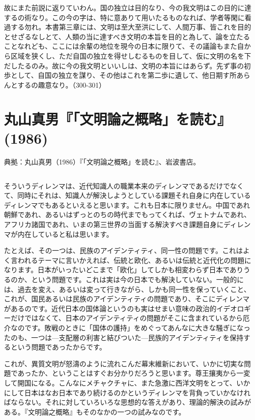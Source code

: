 故にまた前説に返りていわん。国の独立は目的なり、今の我文明はこの目的に達するの術なり。この今の字は、特に意ありて用いたるものなれば、学者等閑に看過する勿れ。本書第三章には、文明は至大至洪にして、人間万事、皆これを目的とせざるなしとて、人類の当に達すべき文明の本旨を目的と為して、論を立たることなれども、ここには余輩の地位を現今の日本に限りて、その議論もまた自から区域を狭くし、ただ自国の独立を得せしむるものを目して、仮に文明の名を下だしたるのみ。故に今の我文明といいしは、文明の本旨にはあらず。先ず事の初歩として、自国の独立を謀り、その他はこれを第二歩に遺して、他日期す所あらんとするの趣意なり。（300-301）




\section{丸山真男『「文明論之概略」を読む』 (1986)}



典拠：丸山真男（1986）『「文明論之概略」を読む』、岩波書店。

\subsection{}




そういうディレンマは、近代知識人の職業本来のディレンマであるだけでなくて、同時にそれは、知識人が解決しようとしている課題それ自身に内在しているディレンマでもあるといえると思います。これも日本に限りません。中国であれ朝鮮であれ、あるいはずっとのちの時代までもってくれば、ヴェトナムであれ、アフリカ諸国であれ、いまの第三世界の当面する解決すべき課題自身にディレンマが内在していると私は思います。

たとえば、その一つは、民族のアイデンティティ、同一性の問題です。これはよく言われるテーマに言いかえれば、伝統と欧化、あるいは伝統と近代化の問題になります。日本がいったいどこまで「欧化」してしかも相変わらず日本でありうるのか、という問題です。これは実は今の日本でも解決していない。一般的には、過去を変え、あるいは変って行きながら、しかも同一性を保っていくこと、これが、国民あるいは民族のアイデンティティの問題であり、そこにディレンマがあるのです。近代日本の国体論というのも実はせまい意味の政治的イデオロギーだけではなくて、日本のアイデンティティの問題がそこに含まれているから厄介なのです。敗戦のときに「国体の護持」をめぐってあんなに大きな騒ぎになったのも、一つは{\——}支配層の利害と結びついた{\——}民族的アイデンティティを保持するという問題であったからです。

これが、異質文明が怒濤のように流れこんだ幕末維新において、いかに切実な問題であったか、ということはすぐお分かりだろうと思います。尊王攘夷から一変して開国になる。こんなにメチャクチャに、また急激に西洋文明をとって、いかにして日本はなお日本であり続けるのかというディレンマを背負っていかなければならない。それに対していろいろな思想的な答えがあり、理論的解決の試みがある。『文明論之概略』もそのなかの一つの試みなのです。

